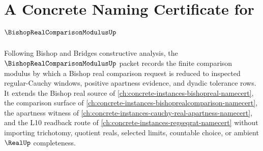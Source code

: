 \chapter{A Concrete Naming Certificate for $\BishopRealComparisonModulusUp$}
\label{ch:concrete-instances-bishop-real-comparison-modulus-namecert}

Following Bishop and Bridges constructive analysis, the $\BishopRealComparisonModulusUp$ packet records the finite comparison modulus by which a Bishop real comparison request is reduced to inspected regular-Cauchy windows, positive apartness evidence, and dyadic tolerance rows. It extends the Bishop real source of \autoref{ch:concrete-instances-bishopreal-namecert}, the comparison surface of \autoref{ch:concrete-instances-bishoprealcomparison-namecert}, the apartness witness of \autoref{ch:concrete-instances-cauchy-real-apartness-namecert}, and the L10 readback route of \autoref{ch:concrete-instances-regseqrat-namecert} without importing trichotomy, quotient reals, selected limits, countable choice, or ambient $\RealUp$ completeness.

